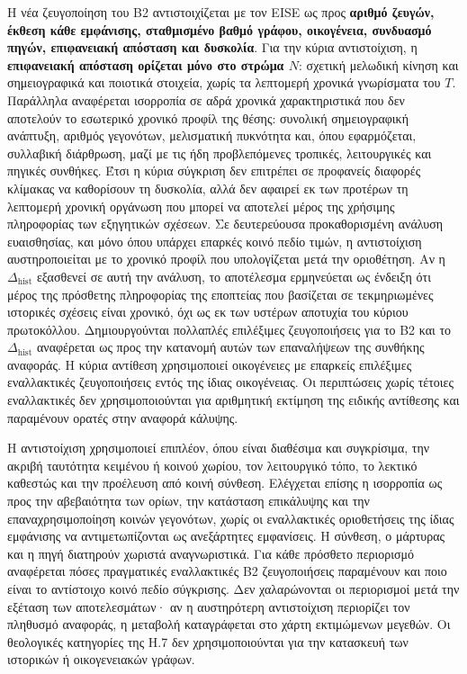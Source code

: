 \documentclass[11pt,a4paper]{article}
\begin{document}
Η νέα ζευγοποίηση του B2 αντιστοιχίζεται με τον EISE ως προς \textbf{αριθμό ζευγών, έκθεση κάθε εμφάνισης, σταθμισμένο βαθμό γράφου, οικογένεια, συνδυασμό πηγών, επιφανειακή απόσταση και δυσκολία}. Για την κύρια αντιστοίχιση, η \textbf{επιφανειακή απόσταση ορίζεται μόνο στο στρώμα $N$}: σχετική μελωδική κίνηση και σημειογραφικά και ποιοτικά στοιχεία, χωρίς τα λεπτομερή χρονικά γνωρίσματα του $T$. Παράλληλα αναφέρεται ισορροπία σε αδρά χρονικά χαρακτηριστικά που δεν αποτελούν το εσωτερικό χρονικό προφίλ της θέσης: συνολική σημειογραφική ανάπτυξη, αριθμός γεγονότων, μελισματική πυκνότητα και, όπου εφαρμόζεται, συλλαβική διάρθρωση, μαζί με τις ήδη προβλεπόμενες τροπικές, λειτουργικές και πηγικές συνθήκες. Έτσι η κύρια σύγκριση δεν επιτρέπει σε προφανείς διαφορές κλίμακας να καθορίσουν τη δυσκολία, αλλά δεν αφαιρεί εκ των προτέρων τη λεπτομερή χρονική οργάνωση που μπορεί να αποτελεί μέρος της χρήσιμης πληροφορίας των εξηγητικών σχέσεων. Σε δευτερεύουσα προκαθορισμένη ανάλυση ευαισθησίας, και μόνο όπου υπάρχει επαρκές κοινό πεδίο τιμών, η αντιστοίχιση αυστηροποιείται με το χρονικό προφίλ που υπολογίζεται μετά την οριοθέτηση. Αν η $\Delta_{\mathrm{hist}}$ εξασθενεί σε αυτή την ανάλυση, το αποτέλεσμα ερμηνεύεται ως ένδειξη ότι μέρος της πρόσθετης πληροφορίας της εποπτείας που βασίζεται σε τεκμηριωμένες ιστορικές σχέσεις είναι χρονικό, όχι ως εκ των υστέρων αποτυχία του κύριου πρωτοκόλλου. Δημιουργούνται πολλαπλές επιλέξιμες ζευγοποιήσεις για το B2 και το $\Delta_{\mathrm{hist}}$ αναφέρεται ως προς την κατανομή αυτών των επαναλήψεων της συνθήκης αναφοράς. Η κύρια αντίθεση χρησιμοποιεί οικογένειες με επαρκείς επιλέξιμες εναλλακτικές ζευγοποιήσεις εντός της ίδιας οικογένειας. Οι περιπτώσεις χωρίς τέτοιες εναλλακτικές δεν χρησιμοποιούνται για αριθμητική εκτίμηση της ειδικής αντίθεσης και παραμένουν ορατές στην αναφορά κάλυψης.

Η αντιστοίχιση χρησιμοποιεί επιπλέον, όπου είναι διαθέσιμα και συγκρίσιμα, την ακριβή ταυτότητα κειμένου ή κοινού χωρίου, τον λειτουργικό τόπο, το λεκτικό καθεστώς και την προέλευση από κοινή σύνθεση. Ελέγχεται επίσης η ισορροπία ως προς την αβεβαιότητα των ορίων, την κατάσταση επικάλυψης και την επαναχρησιμοποίηση κοινών γεγονότων, χωρίς οι εναλλακτικές οριοθετήσεις της ίδιας εμφάνισης να αντιμετωπίζονται ως ανεξάρτητες εμφανίσεις. Η σύνθεση, ο μάρτυρας και η πηγή διατηρούν χωριστά αναγνωριστικά. Για κάθε πρόσθετο περιορισμό αναφέρεται πόσες πραγματικές εναλλακτικές B2 ζευγοποιήσεις παραμένουν και ποιο είναι το αντίστοιχο κοινό πεδίο σύγκρισης. Δεν χαλαρώνονται οι περιορισμοί μετά την εξέταση των αποτελεσμάτων· αν η αυστηρότερη αντιστοίχιση περιορίζει τον πληθυσμό αναφοράς, η μεταβολή καταγράφεται στο χάρτη εκτιμώμενων μεγεθών. Οι θεολογικές κατηγορίες της H.7 δεν χρησιμοποιούνται για την κατασκευή των ιστορικών ή οικογενειακών γράφων.
\end{document}
